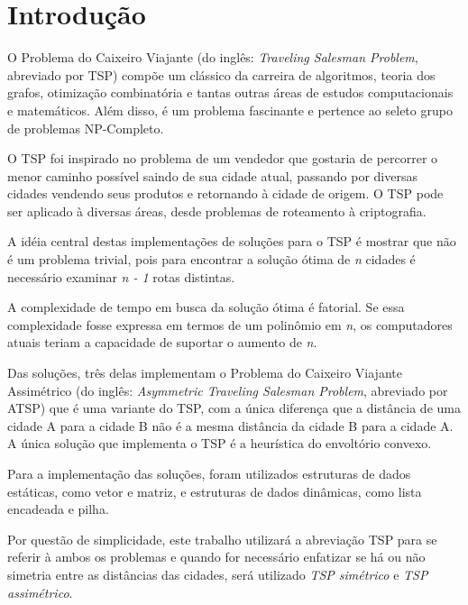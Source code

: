 \documentclass[a4paper,12pt]{article}
\begin{document}
\newpage






\section{Introdução} %

O Problema do Caixeiro Viajante (do inglês: \textit{Traveling Salesman Problem}, abreviado por TSP) compõe um clássico da 
carreira de algoritmos, teoria dos grafos, otimização combinatória e tantas outras 
áreas de estudos computacionais e matemáticos. Além disso, é um problema fascinante e 
pertence ao seleto grupo de problemas NP-Completo.

O TSP foi inspirado no problema de um vendedor que gostaria de percorrer o menor caminho possível 
saindo de sua cidade atual, passando por diversas cidades vendendo seus produtos e retornando à cidade de origem. 
O TSP pode ser aplicado à diversas áreas, desde problemas de roteamento à criptografia. 

A idéia central destas implementações de soluções para o TSP é mostrar que não é um problema trivial, 
pois para encontrar a solução ótima de \emph{n} cidades é necessário examinar \emph{n - 1} rotas distintas.

A complexidade de tempo em busca da solução ótima é fatorial. Se essa complexidade fosse expressa em termos 
de um polinômio em \emph{n}, os computadores atuais teriam a capacidade de suportar o aumento de \emph{n}.

Das soluções, três delas implementam o Problema do Caixeiro Viajante Assimétrico 
(do inglês: \textit{Asymmetric Traveling Salesman Problem}, abreviado por ATSP) que é uma variante do TSP, 
com a única diferença que a distância de uma cidade A para a cidade B não é a mesma distância 
da cidade B para a cidade A. A única solução que implementa o TSP é a heurística do envoltório convexo. 

Para a implementação das soluções, foram utilizados estruturas de dados estáticas, como vetor e matriz, 
e estruturas de dados dinâmicas, como lista encadeada e pilha.

Por questão de simplicidade, este trabalho utilizará a abreviação TSP para se referir à ambos os problemas e quando 
for necessário enfatizar se há ou não simetria entre as distâncias das cidades, será utilizado \emph{TSP simétrico} e 
\emph{TSP assimétrico}.


\end{document}
